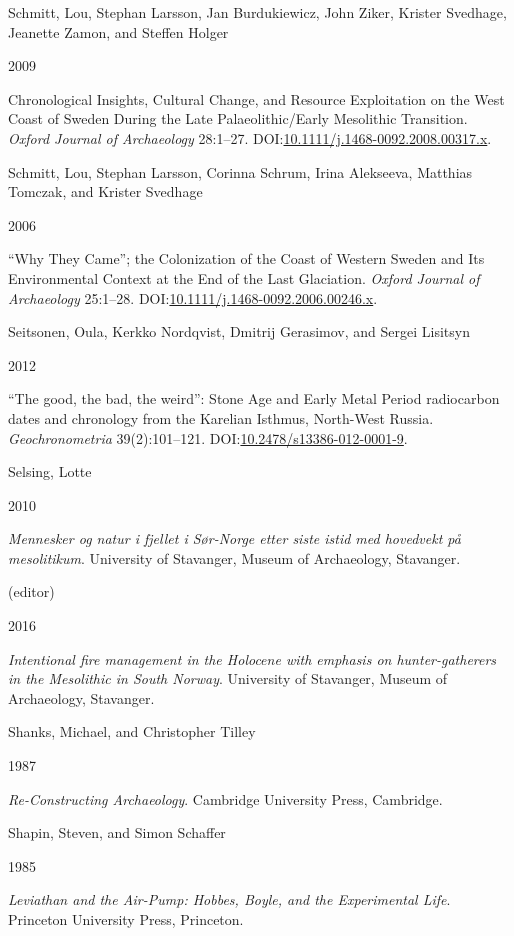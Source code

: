 \documentclass[
  a4paper,
  oneside]{uiophdthesis}
\newlength{\cslhangindent}
\newlength{\csllabelwidth}
\newlength{\cslentryspacingunit} %
\newenvironment{CSLReferences}[2] %
 {%
  \setlength{\parindent}{0pt}
  \ifodd #1
  \let\oldpar\par
  \def\par{\hangindent=\cslhangindent\oldpar}
  \fi
  \setlength{\parskip}{#2\cslentryspacingunit}
 }%
 {}
\newcommand{\CSLBlock}[1]{#1\hfill\break}
\newcommand{\CSLLeftMargin}[1]{\parbox[t]{\csllabelwidth}{#1}}
\newcommand{\CSLRightInline}[1]{\parbox[t]{\linewidth - \csllabelwidth}{#1}\break}
\begin{document}
\begin{CSLReferences}{0}{0}
\leavevmode{}%
\CSLBlock{Schmitt, Lou, Stephan Larsson, Jan Burdukiewicz, John Ziker, Krister Svedhage, Jeanette Zamon, and Steffen Holger}
\CSLLeftMargin{ 2009}
\CSLRightInline{{Chronological Insights, Cultural Change, and Resource Exploitation on the West Coast of Sweden During the Late Palaeolithic/Early Mesolithic Transition}. \emph{Oxford Journal of Archaeology} 28:1--27. DOI:\href{https://doi.org/10.1111/j.1468-0092.2008.00317.x}{10.1111/j.1468-0092.2008.00317.x}.}

\leavevmode{}%
\CSLBlock{Schmitt, Lou, Stephan Larsson, Corinna Schrum, Irina Alekseeva, Matthias Tomczak, and Krister Svedhage}
\CSLLeftMargin{ 2006}
\CSLRightInline{{{``Why They Came''}; the Colonization of the Coast of Western Sweden and Its Environmental Context at the End of the Last Glaciation}. \emph{Oxford Journal of Archaeology} 25:1--28. DOI:\href{https://doi.org/10.1111/j.1468-0092.2006.00246.x}{10.1111/j.1468-0092.2006.00246.x}.}

\leavevmode{}%
\CSLBlock{Seitsonen, Oula, Kerkko Nordqvist, Dmitrij Gerasimov, and Sergei Lisitsyn}
\CSLLeftMargin{ 2012}
\CSLRightInline{{{``The good, the bad, the weird''}: Stone Age and Early Metal Period radiocarbon dates and chronology from the Karelian Isthmus, North-West Russia}. \emph{Geochronometria} 39(2):101--121. DOI:\href{https://doi.org/10.2478/s13386-012-0001-9}{10.2478/s13386-012-0001-9}.}

\leavevmode{}%
\CSLBlock{Selsing, Lotte}
\CSLLeftMargin{ 2010}
\CSLRightInline{\emph{{Mennesker og natur i fjellet i Sør-Norge etter siste istid med hovedvekt på mesolitikum}}. University of Stavanger, Museum of Archaeology, Stavanger.}

\leavevmode{}%
\CSLBlock{ (editor)}
\CSLLeftMargin{ 2016}
\CSLRightInline{\emph{{Intentional fire management in the Holocene with emphasis on hunter-gatherers in the Mesolithic in South Norway}}. University of Stavanger, Museum of Archaeology, Stavanger.}

\leavevmode{}%
\CSLBlock{Shanks, Michael, and Christopher Tilley}
\CSLLeftMargin{ 1987}
\CSLRightInline{\emph{{Re-Constructing Archaeology}}. Cambridge University Press, Cambridge.}

\leavevmode{}%
\CSLBlock{Shapin, Steven, and Simon Schaffer}
\CSLLeftMargin{ 1985}
\CSLRightInline{\emph{{Leviathan and the Air-Pump: Hobbes, Boyle, and the Experimental Life}}. Princeton University Press, Princeton.}


\end{CSLReferences}
\end{document}
